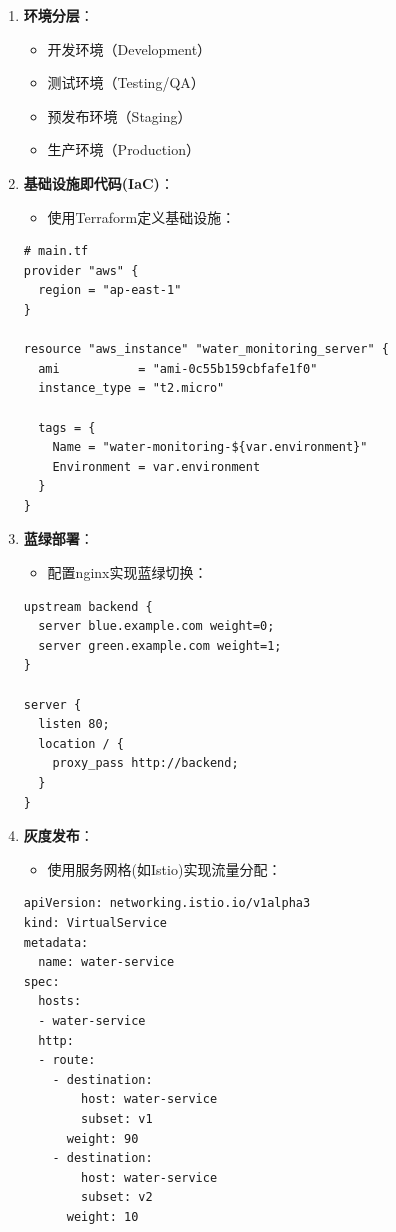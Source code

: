 \begin{enumerate}
\def\labelenumi{\arabic{enumi}.}
\tightlist
\item
  \textbf{环境分层}：

  \begin{itemize}
  \tightlist
  \item
    开发环境（Development）
  \item
    测试环境（Testing/QA）
  \item
    预发布环境（Staging）
  \item
    生产环境（Production）
  \end{itemize}
\item
  \textbf{基础设施即代码(IaC)}：

  \begin{itemize}
  \tightlist
  \item
    使用Terraform定义基础设施：
  \end{itemize}

\begin{lstlisting}
# main.tf
provider "aws" {
  region = "ap-east-1"
}

resource "aws_instance" "water_monitoring_server" {
  ami           = "ami-0c55b159cbfafe1f0"
  instance_type = "t2.micro"

  tags = {
    Name = "water-monitoring-${var.environment}"
    Environment = var.environment
  }
}
\end{lstlisting}
\item
  \textbf{蓝绿部署}：

  \begin{itemize}
  \tightlist
  \item
    配置nginx实现蓝绿切换：
  \end{itemize}

\begin{lstlisting}
upstream backend {
  server blue.example.com weight=0;
  server green.example.com weight=1;
}

server {
  listen 80;
  location / {
    proxy_pass http://backend;
  }
}
\end{lstlisting}
\item
  \textbf{灰度发布}：

  \begin{itemize}
  \tightlist
  \item
    使用服务网格(如Istio)实现流量分配：
  \end{itemize}

\begin{lstlisting}
apiVersion: networking.istio.io/v1alpha3
kind: VirtualService
metadata:
  name: water-service
spec:
  hosts:
  - water-service
  http:
  - route:
    - destination:
        host: water-service
        subset: v1
      weight: 90
    - destination:
        host: water-service
        subset: v2
      weight: 10
\end{lstlisting}
\end{enumerate}

